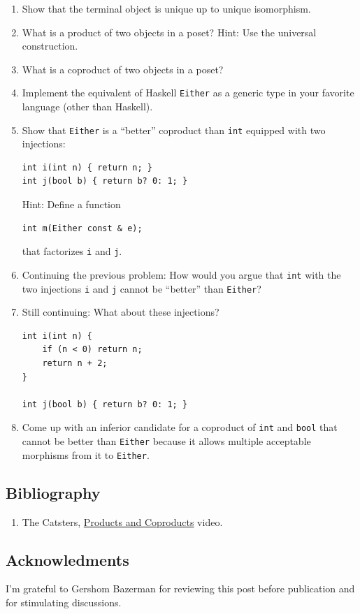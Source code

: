 \begin{enumerate}
  \tightlist
\item
  Show that the terminal object is unique up to unique isomorphism.
\item
  What is a product of two objects in a poset? Hint: Use the universal
  construction.
\item
  What is a coproduct of two objects in a poset?
\item
  Implement the equivalent of Haskell \texttt{Either} as a generic type
  in your favorite language (other than Haskell).
\item
  Show that \texttt{Either} is a ``better'' coproduct than \texttt{int}
  equipped with two injections:

\begin{verbatim}
int i(int n) { return n; }
int j(bool b) { return b? 0: 1; }
\end{verbatim}

  Hint: Define a function

\begin{verbatim}
int m(Either const & e);
\end{verbatim}

  that factorizes \texttt{i} and \texttt{j}.
\item
  Continuing the previous problem: How would you argue that \texttt{int}
  with the two injections \texttt{i} and \texttt{j} cannot be ``better''
  than \texttt{Either}?
\item
  Still continuing: What about these injections?

\begin{verbatim}
int i(int n) { 
    if (n < 0) return n;
    return n + 2;
}

int j(bool b) { return b? 0: 1; }
\end{verbatim}
\item
  Come up with an inferior candidate for a coproduct of \texttt{int} and
  \texttt{bool} that cannot be better than \texttt{Either} because it
  allows multiple acceptable morphisms from it to \texttt{Either}.
\end{enumerate}

\subsection{Bibliography}\label{bibliography}

\begin{enumerate}
\tightlist
\item
  The Catsters,
  \href{https://www.youtube.com/watch?v=upCSDIO9pjc}{Products and
  Coproducts} video.
\end{enumerate}

\subsection{Acknowledments}\label{acknowledments}

I'm grateful to Gershom Bazerman for reviewing this post before
publication and for stimulating discussions.